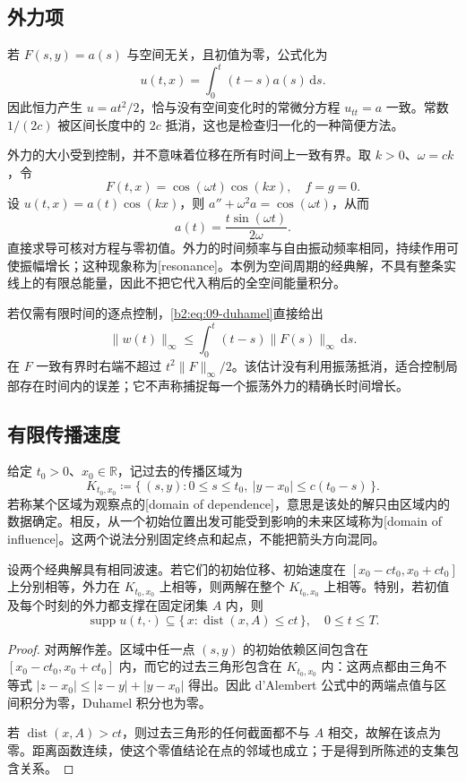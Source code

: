 \subsection{外力项}
\label{b2:subsec:090202}

若 \(F(s,y)=a(s)\) 与空间无关，且初值为零，公式化为
\[
 u(t,x)=\int_0^t(t-s)a(s)\,\mathrm{d}s.
\]
因此恒力产生 \(u=at^2/2\)，恰与没有空间变化时的常微分方程 \(u_{tt}=a\) 一致。常数 \(1/(2c)\) 被区间长度中的 \(2c\) 抵消，这也是检查归一化的一种简便方法。

\ProseParagraphBreak

外力的大小受到控制，并不意味着位移在所有时间上一致有界。取 \(k>0\)、\(\omega=ck\)，令
\[
 F(t,x)=\cos(\omega t)\cos(kx),\quad f=g=0.
\]
设 \(u(t,x)=a(t)\cos(kx)\)，则 \(a''+\omega^2a=\cos(\omega t)\)，从而
\[
 a(t)=\dfrac{t\sin(\omega t)}{2\omega}.
\]
直接求导可核对方程与零初值。外力的时间频率与自由振动频率相同，持续作用可使振幅增长；这种现象称为[resonance]。本例为空间周期的经典解，不具有整条实线上的有限总能量，因此不把它代入稍后的全空间能量积分。

\ProseParagraphBreak

若仅需有限时间的逐点控制，\eqref{b2:eq:09-duhamel}直接给出
\[
 \|w(t)\|_\infty\leq\int_0^t(t-s)\|F(s)\|_\infty\,\mathrm{d}s.
\]
在 \(F\) 一致有界时右端不超过 \(t^2\|F\|_\infty/2\)。该估计没有利用振荡抵消，适合控制局部存在时间内的误差；它不声称捕捉每一个振荡外力的精确长时间增长。

\subsection{有限传播速度}
\label{b2:subsec:090203}

给定 \(t_0>0\)、\(x_0\in\mathbb R\)，记过去的传播区域为
\[
 K_{t_0,x_0}\coloneqq
 \{\,(s,y):0\leq s\leq t_0,\ |y-x_0|\leq c(t_0-s)\,\}.
\]
若称某个区域为观察点的[domain of dependence]，意思是该处的解只由区域内的数据确定。相反，从一个初始位置出发可能受到影响的未来区域称为[domain of influence]。这两个说法分别固定终点和起点，不能把箭头方向混同。

\begin{proposition}[有限传播速度]\label{b2:prop:09-finite-speed}
设两个经典解具有相同波速。若它们的初始位移、初始速度在 \([x_0-ct_0,x_0+ct_0]\) 上分别相等，外力在 \(K_{t_0,x_0}\) 上相等，则两解在整个 \(K_{t_0,x_0}\) 上相等。特别，若初值及每个时刻的外力都支撑在固定闭集 \(A\) 内，则
\[
 \operatorname{supp}u(t,\cdot)\subseteq
 \{\,x:\operatorname{dist}(x,A)\leq ct\,\},\quad 0\leq t\leq T.
\]
\end{proposition}
\begin{proof}
对两解作差。区域中任一点 \((s,y)\) 的初始依赖区间包含在 \([x_0-ct_0,x_0+ct_0]\) 内，而它的过去三角形包含在 \(K_{t_0,x_0}\) 内：这两点都由三角不等式
\(|z-x_0|\leq|z-y|+|y-x_0|\) 得出。因此 d'Alembert 公式中的两端点值与区间积分为零，Duhamel 积分也为零。

若 \(\operatorname{dist}(x,A)>ct\)，则过去三角形的任何截面都不与 \(A\) 相交，故解在该点为零。距离函数连续，使这个零值结论在点的邻域也成立；于是得到所陈述的支集包含关系。
\end{proof}

